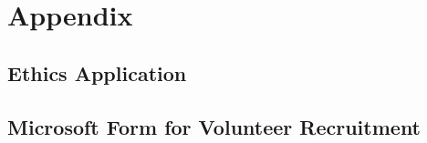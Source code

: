 \chapter*{Appendix}

\label{appendix}

\section*{Ethics Application}
\label{sec:ethics-application}




\section*{Microsoft Form for Volunteer Recruitment}
\label{sec:form-recruitment}


